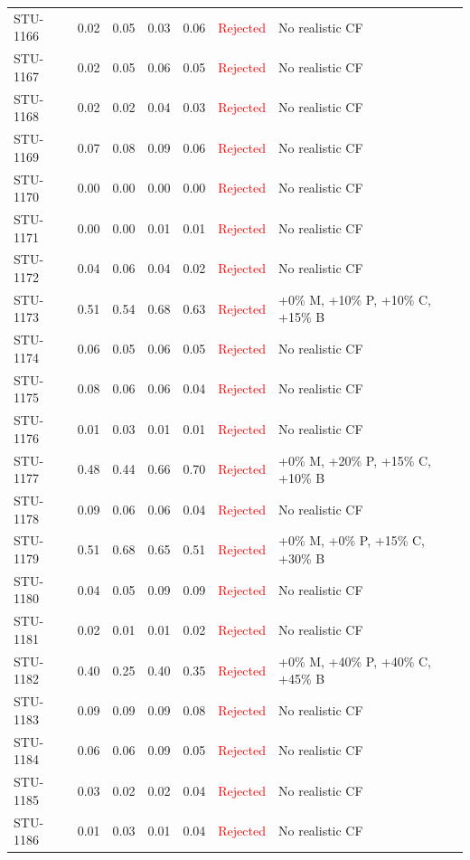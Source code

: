 \begin{longtable}{l c c c c | c | l}
STU-1166 & 0.02 & 0.05 & 0.03 & 0.06 & \textcolor{red}{Rejected} & No realistic CF \\
STU-1167 & 0.02 & 0.05 & 0.06 & 0.05 & \textcolor{red}{Rejected} & No realistic CF \\
STU-1168 & 0.02 & 0.02 & 0.04 & 0.03 & \textcolor{red}{Rejected} & No realistic CF \\
STU-1169 & 0.07 & 0.08 & 0.09 & 0.06 & \textcolor{red}{Rejected} & No realistic CF \\
STU-1170 & 0.00 & 0.00 & 0.00 & 0.00 & \textcolor{red}{Rejected} & No realistic CF \\
STU-1171 & 0.00 & 0.00 & 0.01 & 0.01 & \textcolor{red}{Rejected} & No realistic CF \\
STU-1172 & 0.04 & 0.06 & 0.04 & 0.02 & \textcolor{red}{Rejected} & No realistic CF \\
STU-1173 & 0.51 & 0.54 & 0.68 & 0.63 & \textcolor{red}{Rejected} & +0\% M, +10\% P, +10\% C, +15\% B \\
STU-1174 & 0.06 & 0.05 & 0.06 & 0.05 & \textcolor{red}{Rejected} & No realistic CF \\
STU-1175 & 0.08 & 0.06 & 0.06 & 0.04 & \textcolor{red}{Rejected} & No realistic CF \\
STU-1176 & 0.01 & 0.03 & 0.01 & 0.01 & \textcolor{red}{Rejected} & No realistic CF \\
STU-1177 & 0.48 & 0.44 & 0.66 & 0.70 & \textcolor{red}{Rejected} & +0\% M, +20\% P, +15\% C, +10\% B \\
STU-1178 & 0.09 & 0.06 & 0.06 & 0.04 & \textcolor{red}{Rejected} & No realistic CF \\
STU-1179 & 0.51 & 0.68 & 0.65 & 0.51 & \textcolor{red}{Rejected} & +0\% M, +0\% P, +15\% C, +30\% B \\
STU-1180 & 0.04 & 0.05 & 0.09 & 0.09 & \textcolor{red}{Rejected} & No realistic CF \\
STU-1181 & 0.02 & 0.01 & 0.01 & 0.02 & \textcolor{red}{Rejected} & No realistic CF \\
STU-1182 & 0.40 & 0.25 & 0.40 & 0.35 & \textcolor{red}{Rejected} & +0\% M, +40\% P, +40\% C, +45\% B \\
STU-1183 & 0.09 & 0.09 & 0.09 & 0.08 & \textcolor{red}{Rejected} & No realistic CF \\
STU-1184 & 0.06 & 0.06 & 0.09 & 0.05 & \textcolor{red}{Rejected} & No realistic CF \\
STU-1185 & 0.03 & 0.02 & 0.02 & 0.04 & \textcolor{red}{Rejected} & No realistic CF \\
STU-1186 & 0.01 & 0.03 & 0.01 & 0.04 & \textcolor{red}{Rejected} & No realistic CF \\

\end{longtable}
